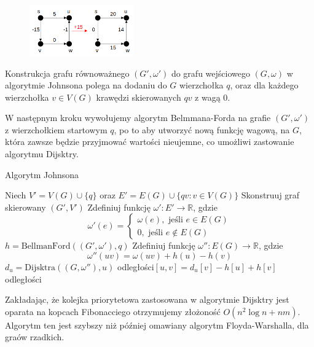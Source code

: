 \begin{figure}[H]
	\centering
	\includegraphics[width=0.4\textwidth]{data/graf_rownowazny_kontrprzyklad.png}
	\caption{  }
	\label{fig:kontrprzyklad_johnson}
\end{figure}

Konstrukcja grafu równoważnego $(G', \omega')$ 
do grafu wejściowego $(G, \omega)$
w algorytmie Johnsona polega na
dodaniu do $G$ wierzchołka $q$, oraz 
dla każdego wierzchołka $v \in V(G)$ krawędzi
skierowanych $qv$ z wagą 0. 

W następnym kroku wywołujemy algorytm Belmmana-Forda
na grafie $(G', \omega')$ z wierzchołkiem 
startowym $q$, po to aby utworzyć nową funkcję wagową,
na $G$, która zawsze będzie przyjmować wartości 
nieujemne, co umożliwi zastowanie 
algorytmu Dijsktry. 

\begin{algorithm}[H]
	\caption{Algorytm Johnsona}
	\begin{algorithmic}[1]
		\State Niech $V'=V(G) \cup \{q\}$ oraz 
		$E' = E(G) \cup \{qv : v \in V(G)\}$
		\State Skonstruuj graf skierowany $(G', V')$
		\State Zdefiniuj funkcję $\omega' : E' \to \mathbb{R}$, 
		gdzie 
		\[\omega'(e) = \begin{cases}
			\omega(e), \text{ jeśli } e \in E(G) \\
			0, \text{ jeśli }  e \not \in E(G)   
		\end{cases}\]
		\State $h = \text{BellmanFord}((G', \omega'), q)$
		\State Zdefiniuj funkcję $\omega'' : E(G) \to \mathbb{R}$, 
		gdzie 
		\[\omega''(uv) = \omega(uv) + h(u) - h(v)\]
		\State $d_u = \text{Dijsktra}((G, \omega''), u)$
		\State odległości$[u, v] = d_u[v] - h[u] + h[v]$
		\EndFor
		\EndFor
		\State \Return odległości
		\EndProcedure
	\end{algorithmic}
	\label{Johnson}
\end{algorithm}

Zakładając, że kolejka priorytetowa zastosowana 
w algorytmie Dijsktry jest oparata na kopcach 
Fibonacciego otrzymujemy złożoność $O(n^2\log n + nm)$. Algorytm 
ten jest szybszy niż później omawiany 
algorytm Floyda-Warshalla, dla graów rzadkich. 

